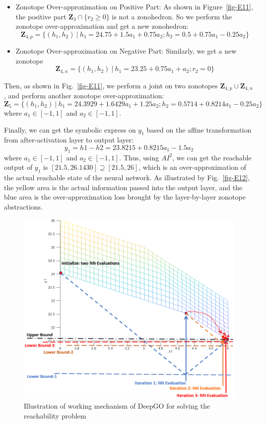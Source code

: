 \begin{itemize}
    \item Zonotope Over-approximation on Positive Part: As shown in Figure~\ref{fig-E11}, the positive part $\mathbf{Z}_3\cap \{r_2\geq 0\}$ is not a zonohedron. So we perform the zonotope over-approximation and get a new zonohedron:
    $$\mathbf{Z}_{4,p} = \{(h_1,h_2)~|~h_1 = 24.75+1.5a_1+0.75a_2; h_2= 0.5 + 0.75a_1 - 0.25a_2\}$$
    
     \item Zonotope Over-approximation on Negative Part: Similarly, we get a new zonotope 
    $$\mathbf{Z}_{4,n} = \{(h_1,h_2)~|~h_1 = 23.25+0.75a_1+a_2; r_2 = 0\}$$
\end{itemize}

Then, as shown in Fig.~\ref{fig-E11}, we perform a joint on two zonotopes $\mathbf{Z}_{4,p}\cup \mathbf{Z}_{4,n}$, and perform another zonotope over-approximation:
%
\begin{equation}
    \mathbf{Z}_5 = \{(h_1,h_2)~|~h_1 = 24.3929+1.6429a_1+1.25a_2; h_2= 0.5714 + 0.8214a_1 - 0.25a_2\}
\end{equation}
%
where $a_1 \in [-1,1]$ and $a_2 \in [-1,1]$.


Finally, we can get the symbolic express on $y_1$ based on the affine transformation from after-activation layer to output layer:
\begin{equation}
    y_1 = h1 - h2 = 23.8215 + 0.8215a_1 - 1.5a_2
\end{equation}
where $a_1 \in [-1,1]$ and $a_2 \in [-1,1]$. Thus, using $AI^2$, we can get the reachable output of $y_1$ is $[21.5, 26.1430] \supseteq	[21.5, 26]$, which is an over-approximation of the actual reachable state of the neural network. As illustrated by Fig.~\ref{fig-E12}, the yellow area is the actual information passed into the output layer, and the blue area is the over-approximation loss brought by the layer-by-layer zonotope abstractions.

\begin{figure}[t]
	\centering
	\includegraphics[width=0.9\linewidth]{images/robustnessVerification/Capture10.PNG}
	\caption{Illustration of working mechanism of DeepGO for solving the reachability problem}
	\label{fig-E13}
\end{figure}
  

